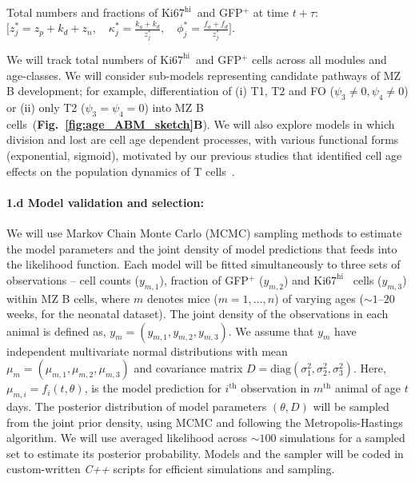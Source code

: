 \documentclass[11pt]{article}
\newcommand{\khi}{\ensuremath{\text{Ki67}^\text{hi}}~}
\newcommand{\para}[1]{\vspace*{-4.5mm}\paragraph{#1}}
\begin{document}
\begin{mybox}
\vspace{1mm}
Total numbers and fractions of \khi and GFP$^+$ at time $t+\tau:$
$\bigg[ z_{j}^* = z_{p} + k_{d} + z_{n}, \quad \kappa_j^* = \frac{k_{a} + k_{d}}{z_{j}^*}, \quad \phi_j^* = \frac{f_{a} + f_{d}}{z_{j}^*}\bigg].$

\end{mybox}
We will track total numbers of \khi and GFP$^+$ cells across all modules and age-classes. We will consider sub-models representing candidate pathways of MZ B development; for example, differentiation of (i) T1, T2 and FO ($\psi_{3}\neq0, \psi_{4}\neq0$) or (ii) only T2 ($\psi_{3} = \psi_{4} = 0$) into MZ B cells~(\textbf{Fig.~\ref{fig:age_ABM_sketch}B}). We will also explore models in which division and lost are cell age dependent processes, with various functional forms (exponential, sigmoid), motivated by our previous studies that identified cell age effects on the population dynamics of T cells~\cite{Rane_2022, Rane_2018}.

\para{{1.d Model validation and selection:}} \label{sec:stats-validation}

We will use  Markov Chain Monte Carlo (MCMC) sampling methods to estimate the model parameters and the joint density of model predictions that feeds into the likelihood function. %
Each model will be fitted simultaneously to three sets of observations -- cell counts ($y_{m,1}$), fraction of {GFP$^+$} ($y_{m,2}$) and {\khi} cells ($y_{m,3}$) within MZ B cells, where $m$ denotes mice ($m = 1,\ldots,n$) of varying ages ($\sim1\text{--}20$ weeks, for the neonatal dataset).
The joint density of the observations in each animal is defined as, $y_{m}=(y_{m,1}, y_{m,2}, y_{m,3})$.
We assume that $y_{m}$ have independent multivariate normal distributions with mean $\mu_{m}=(\mu_{m,1}, \mu_{m,2}, \mu_{m,3})$ and covariance matrix $D = \text{diag}(\sigma_{1}^{2}, \sigma_{2}^{2}, \sigma_{3}^{2})$.
Here, $\mu_{m, i} = f_{i}(t, \theta)$, is the model prediction for  $i^{\text{th}}$ observation in $m^{\text{th}}$ animal of age $t$ days.
The posterior distribution of model parameters $(\theta, D)$ will be sampled from the joint prior density, using MCMC and following the Metropolis-Hastings algorithm. %
We will use averaged likelihood across $\sim100$ simulations for a sampled set to estimate its posterior probability. 
Models and the sampler will be coded in custom-written \textit{C++} scripts for efficient simulations and sampling.
\end{document}
